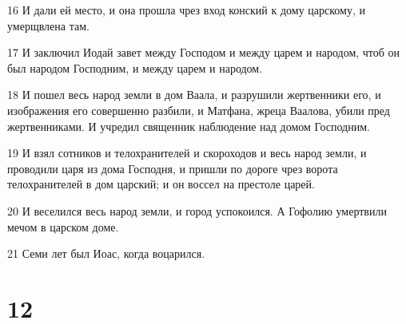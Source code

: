 \par 16 И дали ей место, и она прошла чрез вход конский к дому царскому, и умерщвлена там.
\par 17 И заключил Иодай завет между Господом и между царем и народом, чтоб он был народом Господним, и между царем и народом.
\par 18 И пошел весь народ земли в дом Ваала, и разрушили жертвенники его, и изображения его совершенно разбили, и Матфана, жреца Ваалова, убили пред жертвенниками. И учредил священник наблюдение над домом Господним.
\par 19 И взял сотников и телохранителей и скороходов и весь народ земли, и проводили царя из дома Господня, и пришли по дороге чрез ворота телохранителей в дом царский; и он воссел на престоле царей.
\par 20 И веселился весь народ земли, и город успокоился. А Гофолию умертвили мечом в царском доме.
\par 21 Семи лет был Иоас, когда воцарился.

\chapter{12}

